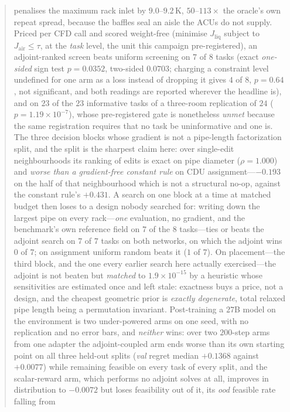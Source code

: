 \documentclass{article}
\newcommand{\Jliq}{J_{\mathrm{liq}}}
\newcommand{\Jair}{J_{\mathrm{air}}}
\begin{document}
\begin{abstract}
penalises the maximum rack inlet by $9.0$--$9.2$\,K, $50$--$113\times$ the oracle's
own repeat spread, because the baffles seal an aisle the ACUs do not supply.  Priced
per CFD call and scored weight-free (minimise $\Jliq$ subject to $\Jair \le \tau$,
at the \emph{task} level, the unit this campaign pre-registered), an
adjoint-ranked screen beats uniform screening on $7$ of $8$ tasks (exact
\emph{one-sided} sign test $p = 0.0352$, two-sided $0.0703$; charging a constraint level undefined for one arm as a loss instead of
dropping it gives $4$ of $8$, $p = 0.64$, not significant, and both readings are reported
wherever the headline is), and on $23$ of the $23$ informative tasks of a three-room
replication of $24$ ($p = 1.19\times10^{-7}$), whose pre-registered gate is nonetheless
\emph{unmet} because the same registration requires that no task be uninformative and one is.
The three decision blocks whose gradient is not a pipe-length factorization split, and
the split is the sharpest claim here: over single-edit neighbourhoods its ranking of edits is
exact on pipe diameter ($\rho = 1.000$) and \emph{worse than a gradient-free constant
rule} on CDU assignment---$-0.193$ on the half of that neighbourhood which is not a
structural no-op, against the constant rule's $+0.431$.  A search on one block at a time
at matched budget then loses to a design nobody searched for: writing down the largest
pipe on every rack---\emph{one} evaluation, no gradient, and the benchmark's own
reference field on $7$ of the $8$ tasks---ties or beats the adjoint search on $7$ of $7$
tasks on both networks, on which the adjoint wins $0$ of $7$; on assignment uniform
random beats it ($1$ of $7$).  On placement---the third block, and the one every earlier search here actually
exercised---the adjoint is not beaten but \emph{matched} to $1.9\times10^{-15}$ by a heuristic
whose sensitivities are estimated once and left stale: exactness buys a price, not a design, and
the cheapest geometric prior is \emph{exactly degenerate}, total relaxed pipe length being a
permutation invariant.
Post-training a $27$B model on the environment is two under-powered arms on one seed, with no replication and no error bars, and
\emph{neither} wins: over two $200$-step arms from one adapter the adjoint-coupled arm ends
worse than its own starting point on all three held-out splits (\emph{val} regret median
$+0.1368$ against $+0.0077$) while remaining feasible on every task of every split, and the
scalar-reward arm, which performs no adjoint solves at all, improves in distribution to
$-0.0072$ but loses feasibility out of it, its \emph{ood} feasible rate falling from

\end{abstract}
\end{document}
